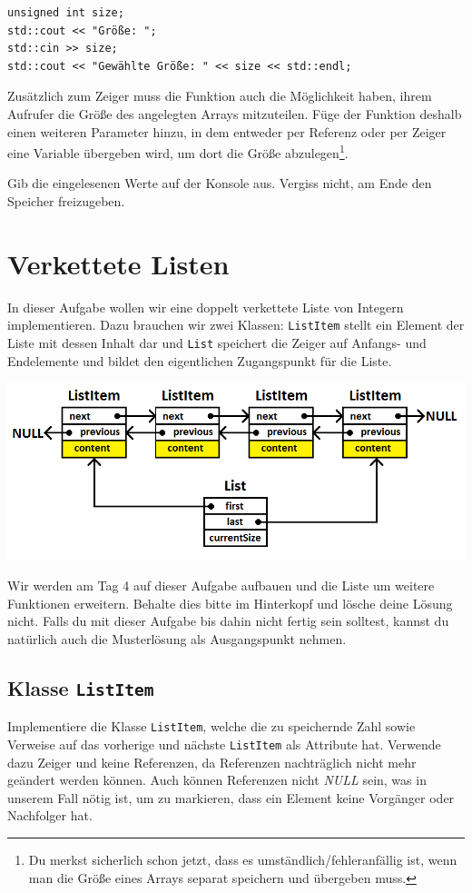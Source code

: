 \begin{lstlisting}
unsigned int size;
std::cout << "Größe: ";
std::cin >> size;
std::cout << "Gewählte Größe: " << size << std::endl;
\end{lstlisting}

Zusätzlich zum Zeiger muss die Funktion auch die Möglichkeit haben, ihrem Aufrufer die Größe des angelegten Arrays mitzuteilen.
Füge der Funktion deshalb einen weiteren Parameter hinzu, in dem entweder per Referenz oder per Zeiger eine Variable übergeben wird, um dort die Größe abzulegen\footnote{Du merkst sicherlich schon jetzt, dass es umständlich/fehleranfällig ist, wenn man die Größe eines Arrays separat speichern und übergeben muss.}.

Gib die eingelesenen Werte auf der Konsole aus.
Vergiss nicht, am Ende den Speicher freizugeben.



\newpage

\section{Verkettete Listen}
In dieser Aufgabe wollen wir eine doppelt verkettete Liste von Integern implementieren.
Dazu brauchen wir zwei Klassen:
\texttt{ListItem} stellt ein Element der Liste mit dessen Inhalt dar und \texttt{List} speichert die Zeiger auf Anfangs- und Endelemente und bildet den eigentlichen Zugangspunkt für die Liste.

\begin{center}
	\includegraphics[width=.7\textwidth]{figures/list.png}
\end{center}

Wir werden am Tag 4 auf dieser Aufgabe aufbauen und die Liste um weitere Funktionen erweitern.
Behalte dies bitte im Hinterkopf und lösche deine Lösung nicht.
Falls du mit dieser Aufgabe bis dahin nicht fertig sein solltest, kannst du natürlich auch die Musterlösung als Ausgangspunkt nehmen.

\subsection{Klasse \texttt{ListItem}}
Implementiere die Klasse \texttt{ListItem}, welche die zu speichernde Zahl sowie Verweise auf das vorherige und nächste \texttt{ListItem} als Attribute hat.
Verwende dazu Zeiger und keine Referenzen, da Referenzen nachträglich nicht mehr geändert werden können.
Auch können Referenzen nicht \emph{NULL} sein, was in unserem Fall nötig ist, um zu markieren, dass ein Element keine Vorgänger oder Nachfolger hat.

